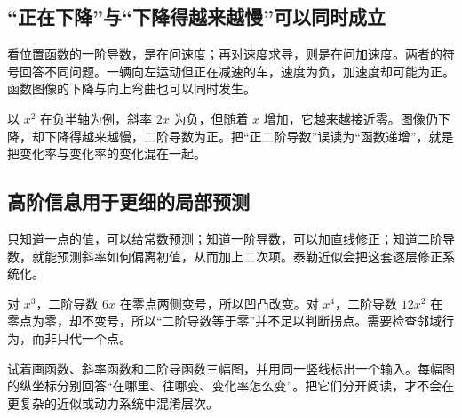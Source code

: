 \subsection*{“正在下降”与“下降得越来越慢”可以同时成立}
看位置函数的一阶导数，是在问速度；再对速度求导，则是在问加速度。两者的符号回答不同问题。一辆向左运动但正在减速的车，速度为负，加速度却可能为正。函数图像的下降与向上弯曲也可以同时发生。

以 $x^2$ 在负半轴为例，斜率 $2x$ 为负，但随着 $x$ 增加，它越来越接近零。图像仍下降，却下降得越来越慢，二阶导数为正。把“正二阶导数”误读为“函数递增”，就是把变化率与变化率的变化混在一起。

\subsection*{高阶信息用于更细的局部预测}
只知道一点的值，可以给常数预测；知道一阶导数，可以加直线修正；知道二阶导数，就能预测斜率如何偏离初值，从而加上二次项。泰勒近似会把这套逐层修正系统化。

对 $x^3$，二阶导数 $6x$ 在零点两侧变号，所以凹凸改变。对 $x^4$，二阶导数 $12x^2$ 在零点为零，却不变号，所以“二阶导数等于零”并不足以判断拐点。需要检查邻域行为，而非只代一个点。

试着画函数、斜率函数和二阶导函数三幅图，并用同一竖线标出一个输入。每幅图的纵坐标分别回答“在哪里、往哪变、变化率怎么变”。把它们分开阅读，才不会在更复杂的近似或动力系统中混淆层次。
